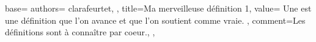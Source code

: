{
  base={
    authors={
      clarafeurtet,
    },
    title=Ma merveilleuse définition 1,
    value={
      Une  est une définition que l'on avance et que l'on soutient comme vraie.
    },
    comment={Les définitions sont à connaître par coeur.},
  },
}
